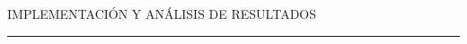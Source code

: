 \begin{titlepage}
	\begin{center}
		
		\textsc{ \Large IMPLEMENTACIÓN Y ANÁLISIS DE RESULTADOS \\[0.5cm]}
		\noindent\rule[-1ex]{\textwidth}{3pt}\\[3.5ex]
		
	\end{center}



\end{titlepage}
